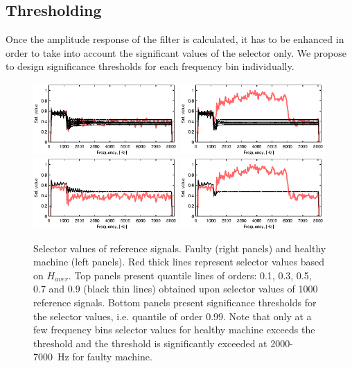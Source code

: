 \subsection{Thresholding}\label{filtering_thresholding}
Once the amplitude response of the filter is calculated, it has to be enhanced in order to take into account the significant values of the selector only. We propose to design significance thresholds for each frequency bin individually.
\begin{figure}[!ht]
\begin{center}
\includegraphics[width=0.49\textwidth]{methodology/filtering/sin_const-quantile_lines_g}
\includegraphics[width=0.49\textwidth]{methodology/filtering/sin_const-quantile_lines_b}
\includegraphics[width=0.49\textwidth]{methodology/filtering/sin_const-quantile_99_g}
\includegraphics[width=0.49\textwidth]{methodology/filtering/sin_const-quantile_99_b}
\caption{Selector values of reference signals. Faulty (right panels) and healthy machine (left panels). Red thick lines represent selector values based on $H_{aver}$. Top panels present quantile lines of orders: 0.1, 0.3, 0.5, 0.7 and 0.9 (black thin lines) obtained upon selector values of 1000 reference signals. Bottom panels present significance thresholds for the selector values, i.e. quantile of order 0.99. Note that only at a few frequency bins selector values for healthy machine exceeds the threshold and the threshold is significantly exceeded at 2000-7000~Hz for faulty machine.\label{filtering_sim-selekt}}
\end{center}
\end{figure}
